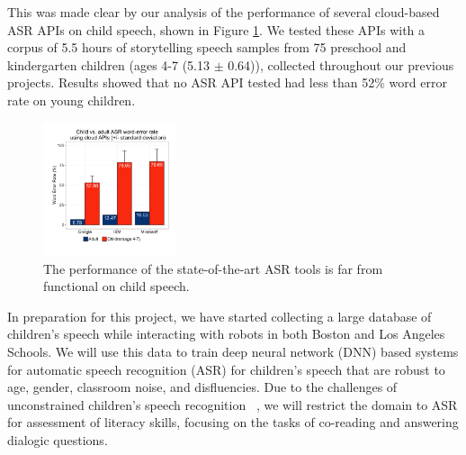 This was made clear by our analysis of the performance of several cloud-based ASR APIs on child speech, shown in Figure \ref{fig:jibo1}. We tested these APIs with a corpus of 5.5 hours of storytelling speech samples from 75 preschool and kindergarten children (ages 4-7 (5.13 $\pm$ 0.64)), collected throughout our previous projects. Results showed that no ASR API tested had less than 52\% word error rate on young children.

\begin{figure}
\vspace{-5mm} 
  \centering
  \includegraphics[width=0.35\textwidth]{fig/asr.pdf}  
  \caption{The performance of the state-of-the-art ASR tools is far from functional on child speech.}
  \vspace{-4mm}   
  \label{fig:jibo1}
\end{figure}


In preparation for this project, we have started collecting a large database of children's speech while interacting with robots in both Boston and Los Angeles Schools. We will use this data to train deep neural network (DNN) based systems for automatic speech recognition (ASR) for children's speech that are robust to age, gender, classroom noise, and disfluencies. Due to the challenges of unconstrained children's speech recognition ~\cite{fainberg2016improving}, we will restrict the domain to ASR for assessment of literacy skills, focusing on the tasks of co-reading and answering dialogic questions.


